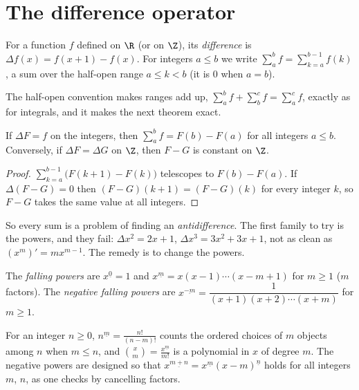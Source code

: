 \section{The difference operator}

\begin{definition}
For a function $f$ defined on $\R$ (or on $\Z$), its \emph{difference} is $\Delta f(x)=f(x+1)-f(x)$. For integers
$a\le b$ we write $\sum_a^bf=\sum_{k=a}^{b-1}f(k)$, a sum over the half-open range $a\le k<b$ (it is $0$ when $a=b$).
\end{definition}

The half-open convention makes ranges add up, $\sum_a^bf+\sum_b^cf=\sum_a^cf$, exactly as for integrals, and it
makes the next theorem exact.

\begin{theorem}\label{thm:ftfc}
If $\Delta F=f$ on the integers, then $\sum_a^bf=F(b)-F(a)$ for all integers $a\le b$. Conversely, if
$\Delta F=\Delta G$ on $\Z$, then $F-G$ is constant on $\Z$.
\end{theorem}
\begin{proof}
$\sum_{k=a}^{b-1}\bigl(F(k+1)-F(k)\bigr)$ telescopes to $F(b)-F(a)$. If $\Delta(F-G)=0$ then $(F-G)(k+1)=(F-G)(k)$ for
every integer $k$, so $F-G$ takes the same value at all integers.
\end{proof}

So every sum is a problem of finding an \emph{antidifference}. The first family to try is the powers, and they
fail: $\Delta x^2=2x+1$, $\Delta x^3=3x^2+3x+1$, not as clean as $(x^m)'=mx^{m-1}$. The remedy is to change the powers.

\begin{definition}
The \emph{falling powers} are $x^{\underline 0}=1$ and $x^{\underline m}=x(x-1)\cdots(x-m+1)$ for $m\ge1$ ($m$ factors).
The \emph{negative falling powers} are $x^{\underline{-m}}=\dfrac1{(x+1)(x+2)\cdots(x+m)}$ for $m\ge1$.
\end{definition}

For an integer $n\ge0$, $n^{\underline m}=\frac{n!}{(n-m)!}$ counts the ordered choices of $m$ objects among $n$ when
$m\le n$, and $\binom xm=\frac{x^{\underline m}}{m!}$ is a polynomial in $x$ of degree $m$. The negative powers are
designed so that $x^{\underline{m+n}}=x^{\underline m}(x-m)^{\underline n}$ holds for all integers $m$, $n$, as one
checks by cancelling factors.

